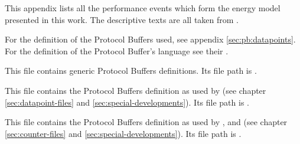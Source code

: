 \appendix
\appendixpage
\addappheadtotoc

\renewcommand\thesection{\Alph{section}}

\label{appendix:chosen-events}

This appendix lists all the performance events which form the energy model
presented in this work. The descriptive texts are all taken from
\cite{intel2011events}.





\label{sec:fmt:datapoints}

For the definition of the Protocol Buffers used, see appendix
\ref{sec:pb:datapoints}. For the definition of the Protocol Buffer's language
see their
.



\label{sec:pb:generic}

This file contains generic Protocol Buffers definitions. Its file path is
.



\label{sec:pb:datapoints}

This file contains the Protocol Buffers definition as used by \JWTlibdp{} (see
chapter \ref{sec:datapoint-files} and \ref{sec:special-developments}). Its file
path is .


\label{sec:pb:counter-files}

This file contains the Protocol Buffers definition as used by \JWTdd{},
\JWTbsle{} and \JWTde{} (see chapter \ref{sec:counter-files} and
\ref{sec:special-developments}). Its file path is
.


